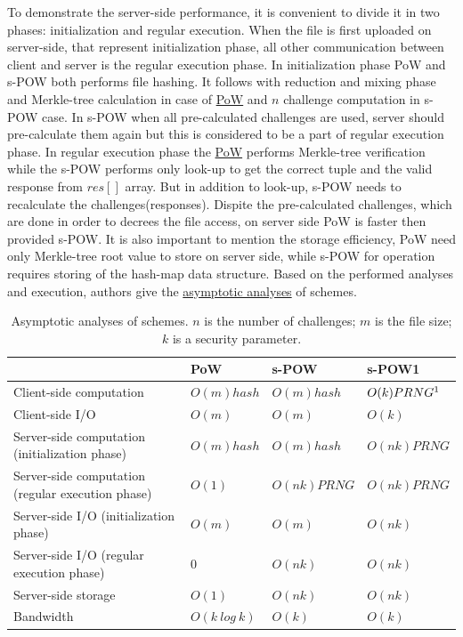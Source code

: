 \documentclass[12pt]{article}
\begin{document}
To demonstrate the server-side performance, it is convenient to divide it in two phases: initialization and regular execution. When the file is first uploaded on server-side, that represent initialization phase, all other communication between client and server is the regular execution phase. In initialization phase PoW and s-POW both performs file hashing. It follows with reduction and mixing phase and Merkle-tree calculation in case of  \hyperref[sub:Soltuion1]{PoW} and $n$ challenge computation in s-POW case. In s-POW when all pre-calculated challenges are used, server should pre-calculate them again but this is considered to be a part of regular execution phase. In regular execution phase the  \hyperref[sub:Soltuion1]{PoW}  performs Merkle-tree verification while the s-POW performs only look-up to get the correct tuple and the valid response from $res[]$  array. But in addition to look-up, s-POW needs to recalculate the challenges(responses). Dispite the pre-calculated challenges, which are done in order to decrees the file access, on server side PoW is faster then provided s-POW. It is also important to mention the storage efficiency, PoW need only Merkle-tree root value to store on server side, while s-POW for operation requires storing of the hash-map data structure.  Based on the performed analyses and execution, authors give the \hyperref[table:asymptoticAnalysis]{asymptotic analyses} of schemes. 


\begin{savenotes}
\begin{table}[!htpb]
\centering
\addtolength{\tabcolsep}{3pt}
\begin{tabular}{|L{6cm}|L{2.5cm}|L{2.5cm}|L{2.5cm}|}
\hline
&PoW&s-POW&s-POW1\\
\hline
Client-side computation&$O(m)hash$ & $O(m)hash$ & $O(k)PRNG\footnote{Pseudorandom number generator}$ \\
\hline
Client-side I/O&$O(m)$&$O(m)$&$O(k)$\\
\hline
Server-side computation (initialization phase)&$O(m) hash$&$O(m) hash$&$O(nk)PRNG$\\
\hline
Server-side computation (regular execution phase)&$O(1)$&$O(nk) PRNG$& $O(nk)PRNG$\\
\hline
Server-side I/O (initialization phase)&$O(m)$&$O(m)$&$O(nk)$\\
\hline
Server-side I/O (regular execution phase)&$0$&$O(nk)$&$O(nk)$\\
\hline
Server-side storage&$O(1)$&$O(nk)$&$O(nk)$\\
\hline
Bandwidth&$O(k\ log\ k)$&$O(k)$&$O(k)$\\
\hline

\end{tabular}
\caption{Asymptotic analyses of schemes. $n$ is the number of challenges; $m$ is the file size; $k$ is a security parameter.}
\label{table:asymptoticAnalysis}
\end{table}
\end{savenotes}
\end{document}

